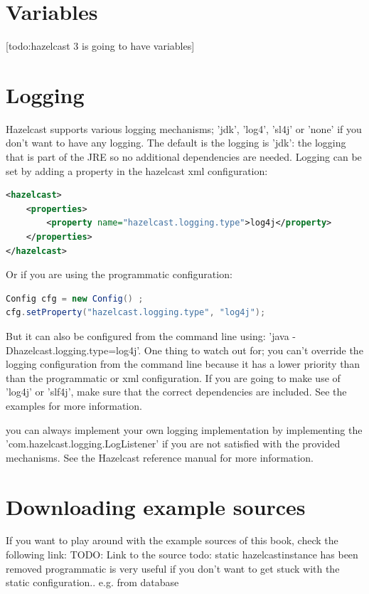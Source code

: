\section{Variables}
[todo:hazelcast 3 is going to have variables] 

\section{Logging}
Hazelcast supports various logging mechanisms; 'jdk', 'log4', 'sl4j' or 'none' if you don't want to have any logging. The default is the logging is 'jdk': the logging that is part of the JRE so no additional dependencies are needed. Logging can be set by adding a property in the hazelcast xml configuration:
\begin{lstlisting}[language=xml]
<hazelcast>
    <properties>
        <property name="hazelcast.logging.type">log4j</property>
    </properties>
</hazelcast>
\end{lstlisting}
Or if you are using the programmatic configuration:
\begin{lstlisting}[language=java]
Config cfg = new Config() ;
cfg.setProperty("hazelcast.logging.type", "log4j");
\end{lstlisting}
But it can also be configured from the command line using: 'java -Dhazelcast.logging.type=log4j'. One thing to watch out for; you can't override the logging configuration from the command line because it has a lower priority than than the programmatic or xml configuration. If you are going to make use of 'log4j' or 'slf4j', make sure that the correct dependencies are included. See the examples for more information.

you can always implement your own logging implementation by implementing the 'com.hazelcast.logging.LogListener' if you are not satisfied with the provided mechanisms. See the Hazelcast reference manual for more information.

\section{Downloading example sources}
If you want to play around with the example sources of this book, check the following link:
TODO: Link to the source
todo: static hazelcastinstance has been removed
programmatic is very useful if you don't want to get stuck with the static configuration.. e.g. from database
